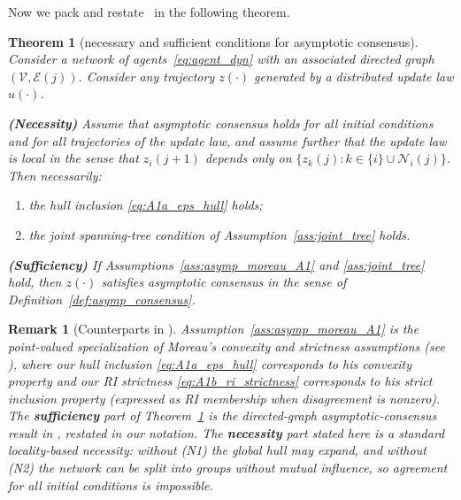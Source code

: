\documentclass[12pt,draftcls,onecolumn]{IEEEtran}
\newtheorem{theorem}{Theorem}
\newtheorem{remark}{Remark}
\begin{document}
Now we pack and restate~\cite[Theorem~1, Theorem~2]{Moreau.2005} in the following theorem.

\begin{theorem}[necessary and sufficient conditions for asymptotic consensus]
\label{thm:moreau_nes_suf}
Consider a network of agents~\eqref{eq:agent_dyn} with an associated directed graph $(\mathcal{V},\mathcal{E}(j))$.
Consider any trajectory $z(\cdot)$ generated by a distributed update law $u(\cdot)$.

\smallskip
\noindent\textbf{(Necessity)}  
Assume that asymptotic consensus holds for all initial conditions and for all trajectories of the update law,
and assume further that the update law is \emph{local} in the sense that $z_i(j+1)$ depends only on
$\{z_k(j):k\in\{i\}\cup\mathcal N_i(j)\}$.
Then necessarily:
\begin{enumerate}
\item[\textbf{(N1)}] the hull inclusion \eqref{eq:A1a_eps_hull} holds;
\item[\textbf{(N2)}] the joint spanning-tree condition of Assumption~\ref{ass:joint_tree} holds.
\end{enumerate}
\smallskip
\noindent\textbf{(Sufficiency)}  
If Assumptions~\ref{ass:asymp_moreau_A1} and \ref{ass:joint_tree} hold, then $z(\cdot)$ satisfies
asymptotic consensus in the sense of Definition~\ref{def:asymp_consensus}.
\end{theorem}

\begin{remark}[Counterparts in \cite{Moreau.2005}]\label{rem:moreau_counterparts}
Assumption~\ref{ass:asymp_moreau_A1} is the point-valued specialization of Moreau's convexity and strictness
assumptions (see \cite[Assumption~1]{Moreau.2005}), where our hull inclusion \eqref{eq:A1a_eps_hull} corresponds
to his convexity property and our RI strictness \eqref{eq:A1b_ri_strictness} corresponds to his
strict inclusion property (expressed as RI membership when disagreement is nonzero).
The \textbf{sufficiency} part of Theorem~\ref{thm:moreau_nes_suf} is the directed-graph asymptotic-consensus result
in \cite[Theorem~2]{Moreau.2005}, restated in our notation. 
The \textbf{necessity} part stated here is a standard locality-based necessity:
without (N1) the global hull may expand, and without (N2) the network can be split into groups without mutual
influence, so agreement for all initial conditions is impossible.
\end{remark}
\end{document}
